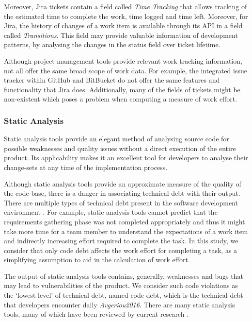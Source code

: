\documentclass{mpaper}
\begin{document}
Moreover, Jira tickets contain a field called \emph{Time Tracking} that
allows tracking of the estimated time to complete the work, time logged and time
left. Moreover, for Jira, the history of changes of a work item is available
through its API in a field called \emph{Transitions}. This field may provide
valuable information of development patterns, by analysing the changes in the
status field over ticket lifetime. 

Although project management tools provide relevant work tracking information,
not all offer the same broad scope of work data. For example, the integrated
issue tracker within GitHub and BitBucket do not offer the same features and
functionality that Jira does. Additionally, many of the fields of tickets might
be non-existent which poses a problem when computing a measure of work effort.

\subsubsection*{Static Analysis}
\label{static-analysis}

Static analysis tools provide an elegant method of analysing source code for
possible weaknesses and quality issues without a direct execution of the entire
product. Its applicability makes it an excellent tool for developers to analyse
their change-sets at any time of the implementation process.

Although static analysis tools provide an approximate measure of the quality of
the code base, there is a danger in associating technical debt with their
output. There are multiple types of technical debt present in the software
development environment \cite{Li2015}. For example, static analysis tools cannot
predict that the requirements gathering phase was not completed appropriately
and thus it might take more time for a team member to understand the
expectations of a work item and indirectly increasing effort required to
complete the task. In this study, we consider that only code debt affects the
work effort for completing a task, as a simplifying assumption to aid in the
calculation of work effort. 

The output of static analysis tools contains, generally, weaknesses and bugs
that may lead to vulnerabilities of the product. We consider such code
violations as the `lowest level' of technical debt, named code debt, which is
the technical debt that developers encounter daily \emph{Avgeriou2016}. There
are many static analysis tools, many of which have been reviewed by current
research \cite{Fontana2011}. 
\end{document}
